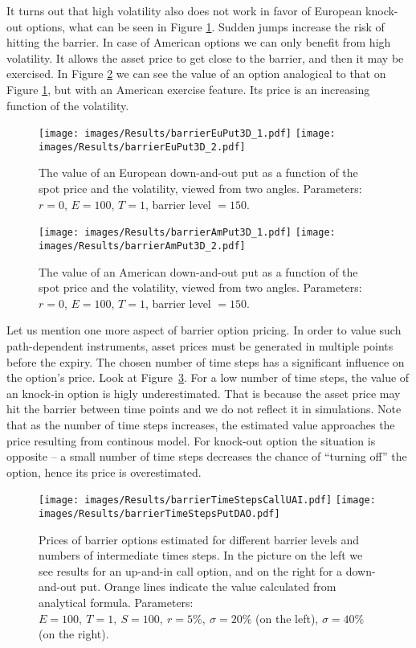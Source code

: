 \documentclass[a4paper,11pt, twoside]{book}
\theoremstyle{definition}
\theoremstyle{remark}
\begin{document}
\FloatBarrier
It turns out that high volatility also does not work in favor of European knock-out options, what can be seen in Figure \ref{fig:results:barrierEuPut3D}. Sudden jumps increase the risk of hitting the barrier. In case of American options we can only benefit from high volatility. It allows the asset price to get close to the barrier, and then it may be exercised. In Figure \ref{fig:results:barrierAmPut3D} we can see the value of an option analogical to that on Figure \ref{fig:results:barrierEuPut3D}, but with an American exercise feature. Its price is an increasing function of the volatility.

\begin{figure}[!htb]
\centering
 \texttt{[image: images/Results/barrierEuPut3D\_1.pdf]}
 \texttt{[image: images/Results/barrierEuPut3D\_2.pdf]}
\caption{The value of an European down-and-out put as a function of the spot price and the volatility, viewed from two angles. Parameters: $r=0$, $E=100$, $T=1$, barrier level $=150$.}
\label{fig:results:barrierEuPut3D}
\end{figure}
\begin{figure}[!htb]
\centering
 \texttt{[image: images/Results/barrierAmPut3D\_1.pdf]}
 \texttt{[image: images/Results/barrierAmPut3D\_2.pdf]}
\caption{The value of an American down-and-out put as a function of the spot price and the volatility, viewed from two angles. Parameters: $r=0$, $E=100$, $T=1$, barrier level $=150$.}
\label{fig:results:barrierAmPut3D}
\end{figure}

Let us mention one more aspect of barrier option pricing. In order to value such path-dependent instruments, asset prices must be generated in multiple points before the expiry. The chosen number of time steps has a significant influence on the option's price. Look at Figure~\ref{fig:results:barrierTimeSteps}. For a low number of time steps, the value of an knock-in option is higly underestimated. That is because the asset price may hit the barrier between time points and we do not reflect it in simulations. Note that as the number of time steps increases, the estimated value approaches the price resulting from continous model. For knock-out option the situation is opposite -- a small number of time steps decreases the chance of ``turning off'' the option, hence its price is overestimated.

\begin{figure}[!htb]
\centering
 \texttt{[image: images/Results/barrierTimeStepsCallUAI.pdf]}
 \texttt{[image: images/Results/barrierTimeStepsPutDAO.pdf]}
\caption{Prices of barrier options estimated for different barrier levels and numbers of intermediate times steps. In the picture on the left we see results for an up-and-in call option, and on the right for a down-and-out put. Orange lines indicate the value calculated from analytical formula. Parameters: $E=100,\ T=1,\ S=100,\ r=5\%,\ \sigma=20\%$ (on the left), $\sigma=40\%$ (on the right).}
\label{fig:results:barrierTimeSteps}
\end{figure}
\end{document}
